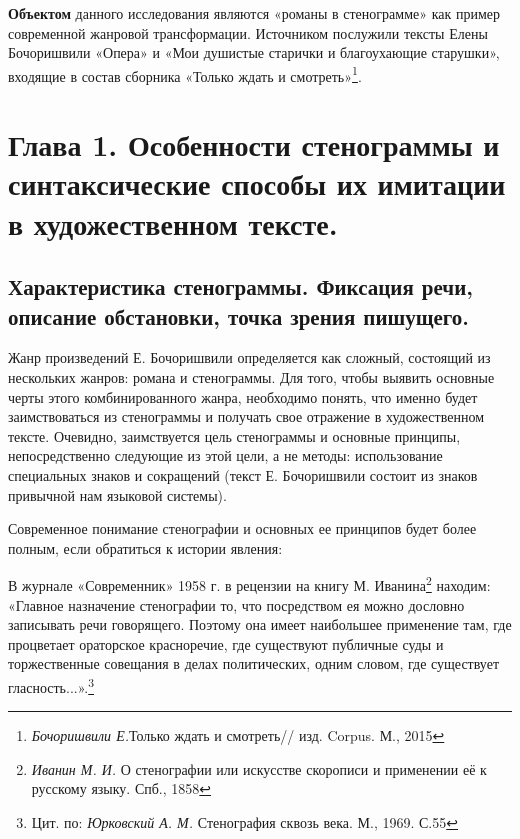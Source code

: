 \documentclass{kursa4}
\begin{document}
    \textbf{Объектом} данного исследования являются «романы в
    стенограмме» как пример современной жанровой трансформации. Источником
    послужили тексты Елены Бочоришвили «Опера» и «Мои душистые старички и
    благоухающие старушки», входящие в состав сборника «Только ждать и
    смотреть»\footnote{{
    }\textit{{Бочоришвили Е.}}{Только
    ждать и смотреть// изд. Corpus. М., 2015}}. 

  \setcounter{chapter}{0}
  \chapter {Глава 1. Особенности стенограммы и
  синтаксические способы их имитации в художественном тексте.}

    \section {Характеристика стенограммы. Фиксация
    речи, описание обстановки, точка зрения пишущего.}

      Жанр произведений Е. Бочоришвили определяется как сложный, состоящий
      из нескольких жанров: романа и стенограммы. Для того, чтобы выявить
      основные черты этого комбинированного жанра, необходимо понять, что
      именно будет заимствоваться из стенограммы и получать свое отражение в
      художественном тексте. Очевидно, заимствуется цель стенограммы и
      основные принципы, непосредственно следующие из этой цели, а не методы:
      использование специальных знаков и сокращений (текст Е. Бочоришвили
      состоит из знаков привычной нам языковой системы). 

      Современное понимание стенографии и основных ее принципов будет
      более полным, если обратиться к истории явления:

      {В журнале «Современник» 1958 г. в рецензии на
      книгу М. Иванина}\footnote{{
      }\textit{{Иванин М. И. }}{О
      стенографии или искусстве скорописи и применении её к русскому языку.
      Спб., 1858}}{ находим: «Главное назначение стенографии
      то, что посредством ея можно дословно записывать речи говорящего.
      Поэтому она имеет наибольшее применение там, где процветает ораторское
      красноречие, где существуют публичные суды и торжественные совещания в
      делах политических, одним словом, где существует
      гласность...».}\footnote{{ Цит. по:
      }\textit{{Юрковский А. М.
      }}{Стенография сквозь века. М., 1969.
      С.55}}{ }
\end{document}
